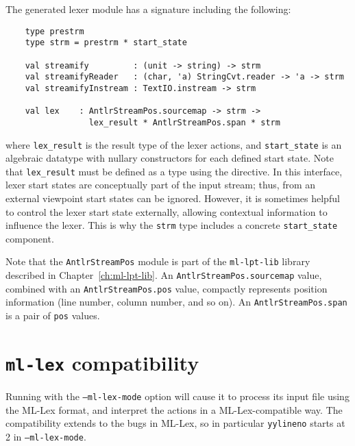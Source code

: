 The generated lexer module has a signature including the following:
\begin{verbatim}
    type prestrm
    type strm = prestrm * start_state
    
    val streamify         : (unit -> string) -> strm
    val streamifyReader   : (char, 'a) StringCvt.reader -> 'a -> strm
    val streamifyInstream : TextIO.instream -> strm
    
    val lex    : AntlrStreamPos.sourcemap -> strm -> 
                 lex_result * AntlrStreamPos.span * strm
\end{verbatim}
where \texttt{lex\_result} is the result type of the lexer actions, and \texttt{start\_state} is an algebraic datatype with nullary constructors for each defined start state.
Note that \texttt{lex\_result} must be defined as a type using the  directive.
In this interface, lexer start states are conceptually part of the input stream; thus, from an external viewpoint start states can be ignored.  However, it is sometimes helpful to control the lexer start state externally, allowing contextual information to influence the lexer.  This is why the \texttt{strm} type includes a concrete \texttt{start\_state} component.

Note that the {\tt AntlrStreamPos} module is part of the {\tt ml-lpt-lib} library described in Chapter~\ref{ch:ml-lpt-lib}.  An {\tt AntlrStreamPos.sourcemap} value, combined with an {\tt AntlrStreamPos.pos} value, compactly represents position information (line number, column number, and so on).  An {\tt AntlrStreamPos.span} is a pair of {\tt pos} values.

\section{\texttt{ml-lex} compatibility}\label{sec:lex-compat}

Running \ulex{} with the {\tt --ml-lex-mode} option will cause it to process its input file using the ML-Lex format, and interpret the actions in a ML-Lex-compatible way.  The compatibility extends to the bugs in ML-Lex, so in particular \texttt{yylineno} starts at 2 in \texttt{--ml-lex-mode}.
